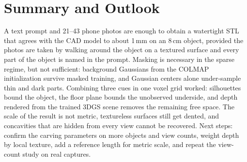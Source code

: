 \documentclass[conference]{IEEEtran}
\begin{document}
\section{Summary and Outlook}

A text prompt and 21--43 phone photos are enough to obtain a watertight STL that agrees with the CAD model to about 1\,mm on an 8\,cm object, provided the photos are taken by walking around the object on a textured surface and every part of the object is named in the prompt. Masking is necessary in the sparse regime, but not sufficient: background Gaussians from the COLMAP initialization survive masked training, and Gaussian centers alone under-sample thin and dark parts. Combining three cues in one voxel grid worked: silhouettes bound the object, the floor plane bounds the unobserved underside, and depth rendered from the trained 3DGS scene removes the remaining free space. The scale of the result is not metric, textureless surfaces still get dented, and concavities that are hidden from every view cannot be recovered. Next steps: confirm the carving parameters on more objects and view counts, weight depth by local texture, add a reference length for metric scale, and repeat the view-count study on real captures.

{\small


}
\end{document}
